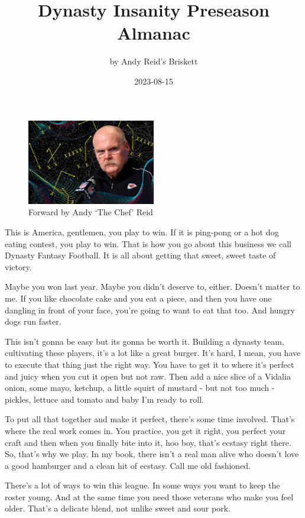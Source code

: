 \documentclass[
]{article}
\title{Dynasty Insanity Preseason Almanac}
\author{by Andy Reid's Briskett}
\date{2023-08-15}
\begin{document}
\maketitle

{
\setcounter{tocdepth}{4}
\tableofcontents
}
\newpage

\begin{figure}
\centering
\includegraphics[width=0.5\textwidth,height=\textheight]{img/andy.png}
\caption{Forward by Andy `The Chef' Reid}
\end{figure}

This is America, gentlemen, you play to win. If it is ping-pong or a hot
dog eating contest, you play to win. That is how you go about this
business we call Dynasty Fantasy Football. It is all about getting that
sweet, sweet taste of victory.

Maybe you won last year. Maybe you didn't deserve to, either. Doesn't
matter to me. If you like chocolate cake and you eat a piece, and then
you have one dangling in front of your face, you're going to want to eat
that too. And hungry dogs run faster.

This isn't gonna be easy but its gonna be worth it. Building a dynasty
team, cultivating these players, it's a lot like a great burger. It's
hard, I mean, you have to execute that thing just the right way. You
have to get it to where it's perfect and juicy when you cut it open but
not raw. Then add a nice slice of a Vidalia onion, some mayo, ketchup, a
little squirt of mustard - but not too much - pickles, lettuce and
tomato and baby I'm ready to roll.

To put all that together and make it perfect, there's some time
involved. That's where the real work comes in. You practice, you get it
right, you perfect your craft and then when you finally bite into it,
hoo boy, that's ecstasy right there. So, that's why we play. In my book,
there isn't a real man alive who doesn't love a good hamburger and a
clean hit of ecstasy. Call me old fashioned.

There's a lot of ways to win this league. In some ways you want to keep
the roster young. And at the same time you need those veterans who make
you feel older. That's a delicate blend, not unlike sweet and sour pork.
\end{document}
